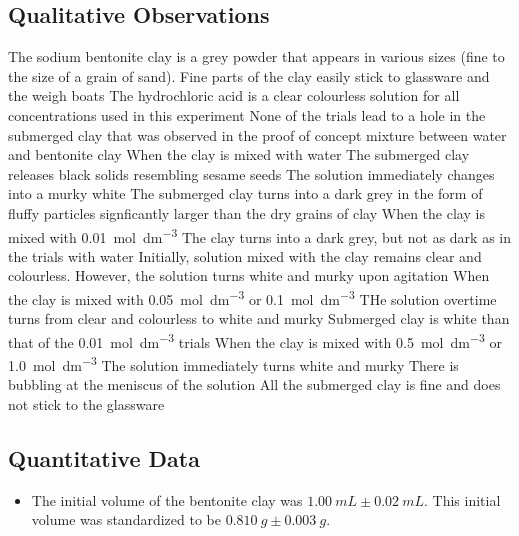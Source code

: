\documentclass[11pt, letterpaper]{article}
\begin{document}
\subsection{Qualitative Observations}
\begin{outline}
    \1 The sodium bentonite clay is a grey powder that appears in various sizes (fine to the size of a grain of sand). Fine parts of the clay easily stick to glassware and the weigh boats
    \1 The hydrochloric acid is a clear colourless solution for all \ce{[H+]} concentrations used in this experiment
    \1 None of the trials lead to a hole in the submerged clay that was observed in the proof of concept mixture between water and bentonite clay
    \1 When the clay is mixed with water
    \2 The submerged clay releases black solids resembling sesame seeds
    \2 The solution immediately changes into a murky white
    \2 The submerged clay turns into a dark grey in the form of fluffy particles signficantly larger than the dry grains of clay
    \1 When the clay is mixed with \SI{0.01}{mol.dm^{-3}} 
    \2 The clay turns into a dark grey, but not as dark as in the trials with water
    \2 Initially, solution mixed with the clay remains clear and colourless. However, the solution turns white and murky upon agitation
    \1 When the clay is mixed with \SI{0.05}{mol.dm^{-3}}  or \SI{0.1}{mol.dm^{-3}} 
    \2 THe solution overtime turns from clear and colourless to white and murky
    \2 Submerged clay is white than that of the \SI{0.01}{mol.dm^{-3}} trials
    \1 When the clay is mixed with \SI{0.5}{mol.dm^{-3}}  or \SI{1.0}{mol.dm^{-3}} 
    \2 The solution immediately turns white and murky
    \2 There is bubbling at the meniscus of the solution
    \2 All the submerged clay is fine and does not stick to the glassware
\end{outline}

\subsection{Quantitative Data}

\begin{itemize}
    \item The initial volume of the bentonite clay was \(\SI{1.00}{mL} \pm \SI{0.02}{mL}\). This initial volume was standardized to be \(\SI{0.810}{g} \pm \SI{0.003}{g}\).
\end{itemize}
\end{document}
